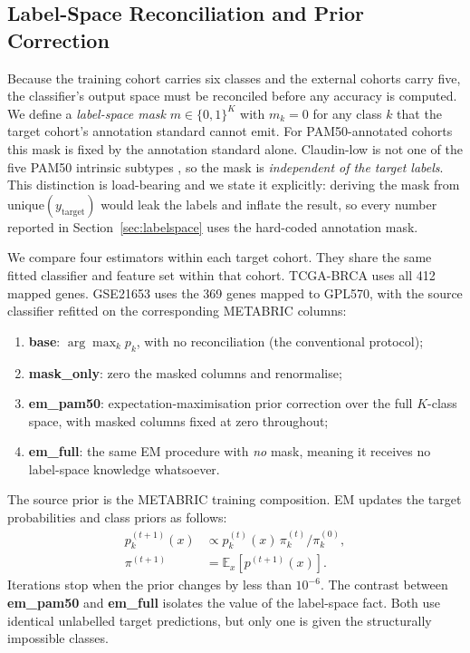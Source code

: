 \documentclass[10pt,journal,compsoc,twocolumn]{IEEEtran}
\begin{document}
\subsection{Label-Space Reconciliation and Prior Correction}
\label{sec:methods_shift}

Because the training cohort carries six classes and the external cohorts carry five, the classifier's output space must be reconciled before any accuracy is computed. We define a \emph{label-space mask} $m \in \{0,1\}^K$ with $m_k = 0$ for any class $k$ that the target cohort's annotation standard cannot emit. For PAM50-annotated cohorts this mask is fixed by the annotation standard alone. Claudin-low is not one of the five PAM50 intrinsic subtypes \cite{parker2009supervised}, so the mask is \emph{independent of the target labels}. This distinction is load-bearing and we state it explicitly: deriving the mask from $\text{unique}(y_{\text{target}})$ would leak the labels and inflate the result, so every number reported in Section~\ref{sec:labelspace} uses the hard-coded annotation mask.

We compare four estimators within each target cohort. They share the same fitted classifier and feature set within that cohort. TCGA-BRCA uses all 412 mapped genes. GSE21653 uses the 369 genes mapped to GPL570, with the source classifier refitted on the corresponding METABRIC columns:

\begin{enumerate}
  \item \textbf{base}: $\arg\max_k p_k$, with no reconciliation (the conventional protocol);
  \item \textbf{mask\_only}: zero the masked columns and renormalise;
  \item \textbf{em\_pam50}: expectation-maximisation prior correction \cite{saerens2002adjusting} over the full $K$-class space, with masked columns fixed at zero throughout;
  \item \textbf{em\_full}: the same EM procedure with \emph{no} mask, meaning it receives no label-space knowledge whatsoever.
\end{enumerate}

The source prior is the METABRIC training composition. EM updates the target probabilities and class priors as follows:
\begin{align*}
p_k^{(t+1)}(x) &\propto p_k^{(t)}(x)\, \pi_k^{(t)} / \pi_k^{(0)}, \\
\pi^{(t+1)} &= \mathbb{E}_x[p^{(t+1)}(x)].
\end{align*}
Iterations stop when the prior changes by less than $10^{-6}$. The contrast between \textbf{em\_pam50} and \textbf{em\_full} isolates the value of the label-space fact. Both use identical unlabelled target predictions, but only one is given the structurally impossible classes.
\end{document}
